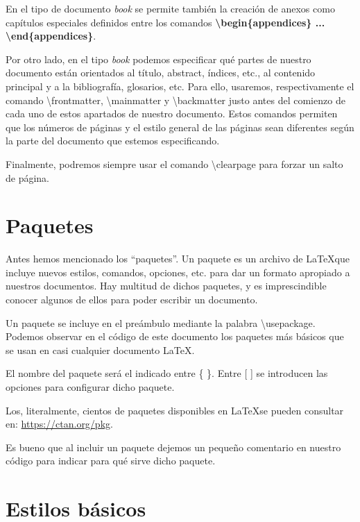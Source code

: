 \documentclass[12pt]{book} %
\begin{document}
En el tipo de documento \emph{book} se permite también la creación de anexos como capítulos especiales definidos entre los comandos \textbf{\textbackslash begin\{appendices\} ... \textbackslash end\{appendices\}}.

Por otro lado, en el tipo \emph{book} podemos especificar qué partes de nuestro documento están orientados al título, abstract, índices, etc., al contenido principal y a la bibliografía, glosarios, etc. Para ello, usaremos, respectivamente el comando \textbackslash frontmatter, \textbackslash mainmatter y \textbackslash backmatter justo antes del comienzo de cada uno de estos apartados de nuestro documento. Estos comandos permiten que los números de páginas y el estilo general de las páginas sean diferentes según la parte del documento que estemos especificando.

Finalmente, podremos siempre usar el comando \textbackslash clearpage para forzar un salto de página.

\section{Paquetes}

Antes hemos mencionado los ``paquetes''. Un paquete es un archivo de \LaTeX que incluye nuevos estilos, comandos, opciones, etc. para dar un formato apropiado a nuestros documentos. Hay multitud de dichos paquetes, y es imprescindible conocer algunos de ellos para poder escribir un documento.

Un paquete se incluye en el preámbulo mediante la palabra \textbackslash usepackage. Podemos observar en el código de este documento los paquetes más básicos que se usan en casi cualquier documento \LaTeX. 

El nombre del paquete será el indicado entre \{ \}.  Entre [ ] se introducen las opciones para configurar dicho paquete.

Los, literalmente, cientos de paquetes disponibles en \LaTeX se pueden consultar en: \url{https://ctan.org/pkg}.


Es bueno que al incluir un paquete dejemos un pequeño comentario en nuestro código para indicar para qué sirve dicho paquete.

\section{Estilos básicos}
\end{document}
